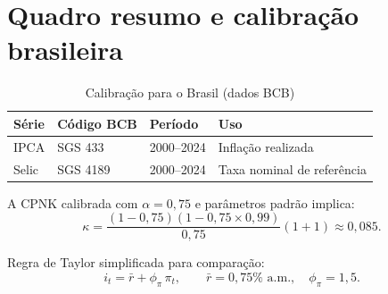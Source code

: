 \documentclass[11pt,a4paper]{article}
\begin{document}
\section{Quadro resumo e calibração brasileira}

\begin{table}[h!]
\centering
\caption{Calibração para o Brasil (dados BCB)}
\begin{tabular}{llll}
\toprule
Série & Código BCB & Período & Uso \\
\midrule
IPCA & SGS 433 & 2000--2024 & Inflação realizada \\
Selic & SGS 4189 & 2000--2024 & Taxa nominal de referência \\
\bottomrule
\end{tabular}
\end{table}

A CPNK calibrada com $\alpha=0{,}75$ e parâmetros padrão implica:
\begin{equation}
  \kappa = \frac{(1-0{,}75)(1-0{,}75 \times 0{,}99)}{0{,}75}(1 + 1)
         \approx 0{,}085.
\end{equation}

Regra de Taylor simplificada para comparação:
\begin{equation}
  i_t = \bar{r} + \phi_\pi\,\pi_t, \qquad
  \bar{r} = 0{,}75\%\text{ a.m.}, \quad \phi_\pi = 1{,}5.
\end{equation}
\end{document}
